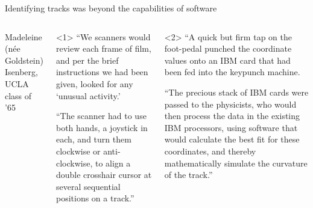 \documentclass[aspectratio=169]{beamer}
\begin{document}
\begin{frame}{Identifying tracks was beyond the capabilities of software}
\begin{columns}
\begin{center}
\scriptsize
Madeleine (n\'ee Goldstein) Isenberg, UCLA class of '65
\end{center}

\begin{minipage}{\linewidth}
\scriptsize
\begin{onlyenv}<1>
``We scanners would review each frame of film, and per the brief instructions we had been given, looked for any `unusual activity.'

\vspace{0.25 cm}
``The scanner had to use both hands, a joystick in each, and turn them clockwise or anti-clockwise, to align a double crosshair cursor at several sequential positions on a track.''
\end{onlyenv}\begin{onlyenv}<2>
``A quick but firm tap on the foot-pedal punched the coordinate values onto an IBM card that had been fed into the keypunch machine.

\vspace{0.25 cm}
``The precious stack of IBM cards were passed to the physicists, who would then process the data in the existing IBM processors, using software that would calculate the best fit for these coordinates, and thereby mathematically simulate the curvature of the track.''
\end{onlyenv}
\end{minipage}
\end{columns}
\end{frame}
\end{document}
